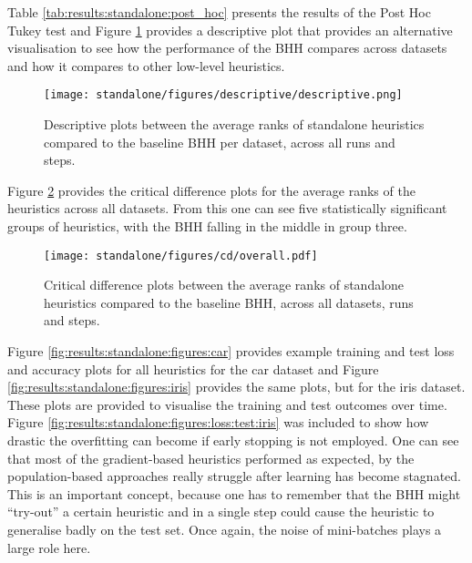 Table \ref{tab:results:standalone:post_hoc} presents the results of the Post Hoc Tukey test and Figure \ref{fig:results:standalone:descriptive:descriptive} provides a descriptive plot that provides an alternative visualisation to see how the performance of the \Ac{BHH} compares across datasets and how it compares to other low-level heuristics.

\begin{figure}[htbp]
      \centering
      \texttt{[image: standalone/figures/descriptive/descriptive.png]}
      \caption{Descriptive plots between the average ranks of standalone heuristics compared to the baseline \Acs{BHH} per dataset, across all runs and steps.}
      \label{fig:results:standalone:descriptive:descriptive}
\end{figure}

Figure \ref{fig:results:standalone:descriptive:cd} provides the critical difference plots for the average ranks of the heuristics across all datasets. From this one can see five statistically significant groups of heuristics, with the \Ac{BHH} falling in the middle in group three.


\begin{figure}[htbp]
      \centering
      \texttt{[image: standalone/figures/cd/overall.pdf]}
      \caption{Critical difference plots between the average ranks of standalone heuristics compared to the baseline \Acs{BHH}, across all datasets, runs and steps.}
      \label{fig:results:standalone:descriptive:cd}
\end{figure}

Figure \ref{fig:results:standalone:figures:car} provides example training and test loss and accuracy plots for all heuristics for the car dataset and Figure \ref{fig:results:standalone:figures:iris} provides the same plots, but for the iris dataset. These plots are provided to visualise the training and test outcomes over time. Figure \ref{fig:results:standalone:figures:loss:test:iris} was included to show how drastic the overfitting can become if early stopping is not employed. One can see that most of the gradient-based heuristics performed as expected, by the population-based approaches really struggle after learning has become stagnated. This is an important concept, because one has to remember that the \Ac{BHH} might ``try-out'' a certain heuristic and in a single step could cause the heuristic to generalise badly on the test set. Once again, the noise of mini-batches plays a large role here.






